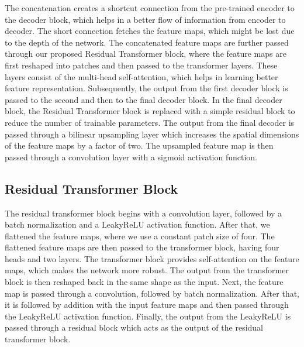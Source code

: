 \documentclass{midl} \usepackage{mwe}
\begin{document}
The concatenation creates a shortcut connection from the pre-trained encoder to the decoder block, which helps in a better flow of information from encoder to decoder. The short connection fetches the feature maps, which might be lost due to the depth of the network. The concatenated feature maps are further passed through our proposed Residual Transformer block, where the feature maps are first reshaped into patches and then passed to the transformer layers. These layers consist of the multi-head self-attention, which helps in learning better feature representation. Subsequently, the output from the first decoder block is passed to the second and then to the final decoder block. In the final decoder block, the Residual Transformer block is replaced with a simple residual block to reduce the number of trainable parameters. The output from the final decoder is passed through a bilinear upsampling layer which increases the spatial dimensions of the feature maps by a factor of two. The upsampled feature map is then passed through a  convolution layer with a sigmoid activation function.
\subsection{Residual Transformer Block}
The residual transformer block begins with a  convolution layer, followed by a batch normalization and a LeakyReLU activation function. After that, we flattened the feature maps, where we use a constant patch size of four. The flattened feature maps are then passed to the transformer block, having four heads and two layers. The transformer block provides self-attention on the feature maps, which makes the network more robust. The output from the transformer block is then reshaped back in the same shape as the input. Next, the feature map is passed through a  convolution, followed by batch normalization. After that, it is followed by addition with the input feature maps and then passed through the LeakyReLU activation function. Finally, the output from the LeakyReLU is passed through a residual block which acts as the output of the residual transformer block.
 
\end{document}
